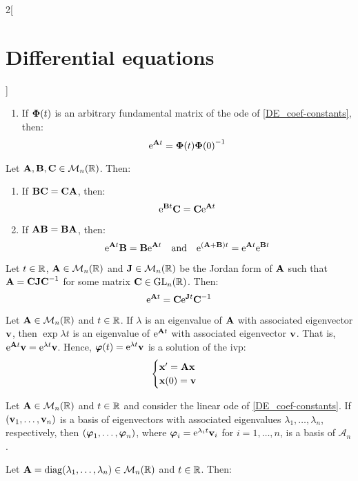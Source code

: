 \documentclass[../../../main_math.tex]{subfiles}
\begin{document}
\begin{multicols}{2}[\section{Differential equations}]
\begin{proposition}
\begin{enumerate}
      \item If $\vf{\Phi}(t)$ is an arbitrary fundamental matrix of the ode of \cref{DE_coef-constants}, then: $$\exp{\vf{A}t}=\vf{\Phi}(t){\vf{\Phi}(0)}^{-1}$$
    \end{enumerate}
  \end{proposition}
  \begin{lemma}
    Let $\vf{A},\vf{B},\vf{C}\in\mathcal{M}_n(\RR)$. Then:
    \begin{enumerate}
      \item If $\vf{B}\vf{C}=\vf{C}\vf{A}$, then: $$\exp{\vf{B}t}\vf{C}=\vf{C}\exp{\vf{A}t}$$
      \item If $\vf{A}\vf{B}=\vf{B}\vf{A}$, then: $$\exp{\vf{A}t}\vf{B}=\vf{B}\exp{\vf{A}t}\quad\text{and}\quad\exp{(\vf{A}+\vf{B})t}=\exp{\vf{A}t}\exp{\vf{B}t}$$
    \end{enumerate}
  \end{lemma}
  \begin{corollary}
    Let $t\in\RR$, $\vf{A}\in\mathcal{M}_n(\RR)$ and $\vf{J}\in\mathcal{M}_n(\RR)$ be the Jordan form of $\vf{A}$ such that $\vf{A}=\vf{C}\vf{J}\vf{C}^{-1}$ for some matrix $\vf{C}\in\GL_n(\RR)$. Then: $$\exp{\vf{A}t}=\vf{C}\exp{\vf{J}t}\vf{C}^{-1}$$
  \end{corollary}
  \begin{proposition}
    Let $\vf{A}\in\mathcal{M}_n(\RR)$ and $t\in\RR$. If $\lambda$ is an eigenvalue of $\vf{A}$ with associated eigenvector $\vf{v}$, then $\exp{\lambda t}$ is an eigenvalue of $\exp{\vf{A}t}$ with associated eigenvector $\vf{v}$. That is, $\exp{\vf{A}t}\vf{v}=\exp{\lambda t}\vf{v}$. Hence, $\vf{\varphi}(t)=\exp{\lambda t}\vf{v}$ is a solution of the ivp:
    $$
      \begin{cases}
        \vf{x}'      =\vf{A}\vf{x} \\
        \vf{x}(0)  =\vf{v}
      \end{cases}
    $$
  \end{proposition}
  \begin{corollary}
    Let $\vf{A}\in\mathcal{M}_n(\RR)$ and $t\in\RR$ and consider the linear ode of \cref{DE_coef-constants}. If $(\vf{v}_1,\ldots,\vf{v}_n)$ is a basis of eigenvectors with associated eigenvalues $\lambda_1,\ldots,\lambda_n$, respectively, then $(\vf{\varphi}_1,\ldots,\vf{\varphi}_n)$, where $\vf{\varphi}_i=\exp{\lambda_it}\vf{v}_i$ for $i=1,\ldots,n$, is a basis of $\mathcal{A}_n$.
  \end{corollary}
  \begin{lemma}
    Let $\vf{A}=\diag(\lambda_1,\ldots,\lambda_n)\in\mathcal{M}_n(\RR)$ and $t\in\RR$. Then:

\end{lemma}
\end{multicols}
\end{document}
